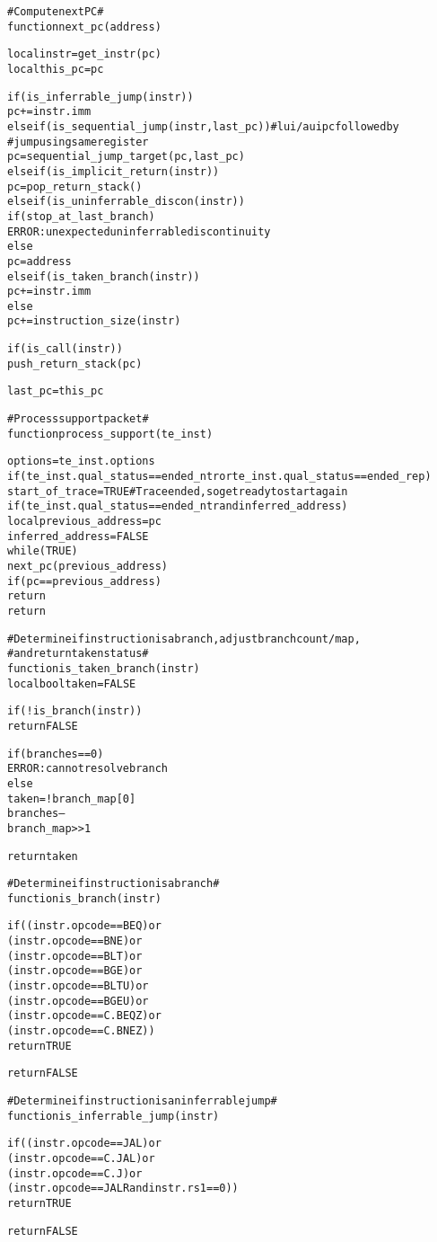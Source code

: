 \begin{alltt}
# Compute next PC #
function next_pc (address)

  local instr   = get_instr(pc)
  local this_pc = pc

  if (is_inferrable_jump(instr))
    pc += instr.imm
  else if (is_sequential_jump(instr, last_pc)) # lui/auipc followed by
                                               #  jump using same register
    pc = sequential_jump_target(pc, last_pc)
  else if (is_implicit_return(instr))
    pc = pop_return_stack()
  else if (is_uninferrable_discon(instr))
    if (stop_at_last_branch)
      ERROR: unexpected uninferrable discontinuity
    else
      pc = address
  else if (is_taken_branch(instr))
    pc += instr.imm
  else
    pc += instruction_size(instr)

  if (is_call(instr))
    push_return_stack(pc)

  last_pc = this_pc

# Process support packet #
function process_support (te_inst)

  options = te_inst.options
    if (te_inst.qual_status == ended_ntr or te_inst.qual_status == ended_rep)
      start_of_trace = TRUE # Trace ended, so get ready to start again
    if (te_inst.qual_status == ended_ntr and inferred_address)
      local previous_address = pc
      inferred_address       = FALSE
      while (TRUE)
        next_pc(previous_address)
        if (pc == previous_address)
          return
    return

\end{alltt}

\pagebreak

\begin{alltt}
# Determine if instruction is a branch, adjust branch count/map,
#   and return taken status #
function is_taken_branch (instr)
  local bool taken = FALSE

  if (!is_branch(instr))
    return FALSE

  if (branches == 0)
    ERROR: cannot resolve branch
  else
    taken = !branch_map[0]
    branches--
    branch_map >> 1

  return taken

# Determine if instruction is a branch #
function is_branch (instr)

  if ((instr.opcode == BEQ)    or
      (instr.opcode == BNE)    or
      (instr.opcode == BLT)    or
      (instr.opcode == BGE)    or
      (instr.opcode == BLTU)   or
      (instr.opcode == BGEU)   or
      (instr.opcode == C.BEQZ) or
      (instr.opcode == C.BNEZ))
    return TRUE

  return FALSE

# Determine if instruction is an inferrable jump #
function is_inferrable_jump (instr)

  if ((instr.opcode == JAL)   or
      (instr.opcode == C.JAL) or
      (instr.opcode == C.J)   or
      (instr.opcode == JALR and instr.rs1 == 0))
    return TRUE

  return FALSE
\end{alltt}

